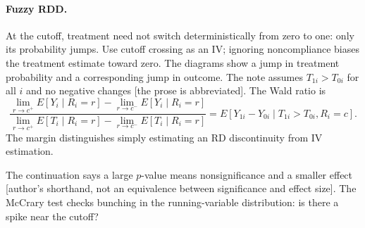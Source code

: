 {\paragraph{Fuzzy RDD.}
At the cutoff, treatment need not switch deterministically from zero to one: only its probability jumps. Use cutoff crossing as an IV; ignoring noncompliance biases the treatment estimate toward zero. The diagrams show a jump in treatment probability and a corresponding jump in outcome. The note assumes $T_{1i}>T_{0i}$ for all $i$ and no negative changes [the prose is abbreviated]. The Wald ratio is
\[
\frac{\lim_{r\to c^+}E[Y_i\mid R_i=r]-\lim_{r\to c^-}E[Y_i\mid R_i=r]}
{\lim_{r\to c^+}E[T_i\mid R_i=r]-\lim_{r\to c^-}E[T_i\mid R_i=r]}
=E[Y_{1i}-Y_{0i}\mid T_{1i}>T_{0i},R_i=c].
\]
The margin distinguishes simply estimating an RD discontinuity from IV estimation.

The continuation says a large $p$-value means nonsignificance and a smaller effect [author's shorthand, not an equivalence between significance and effect size]. The McCrary test checks bunching in the running-variable distribution: is there a spike near the cutoff?

\begin{center}
\end{center}}
